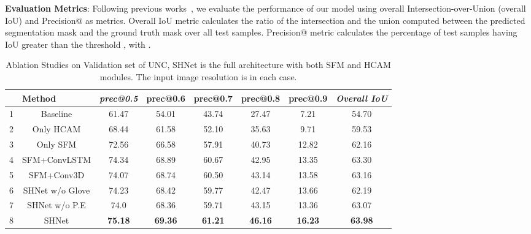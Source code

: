 \documentclass[11pt]{article}
\begin{document}
\textbf{Evaluation Metrics}: Following previous works~\cite{ye2019cross, Chen_2019_ICCV, Hu_2020_CVPR}, we evaluate the performance of our model using overall Intersection-over-Union (overall IoU) and Precision@ as metrics. Overall IoU metric calculates the ratio of the intersection and the union computed between the predicted segmentation mask and the ground truth mask over all test samples. Precision@ metric calculates the percentage of test samples having IoU greater than the threshold , with .

\begin{table*}[]
\small
\begin{center}
\begin{tabular}{r|c|c|c|c|c|c|c}
\hline
\multicolumn{1}{l|}{} &
  \multicolumn{1}{l|}{Method} &
  \multicolumn{1}{l|}{\textit{prec@0.5}} &
  \multicolumn{1}{l|}{prec@0.6} &
  \multicolumn{1}{l|}{prec@0.7} &
  \multicolumn{1}{l|}{prec@0.8} &
  \multicolumn{1}{l|}{prec@0.9} &
  \multicolumn{1}{l}{\textit{Overall IoU}} \\ \hline
1 & Baseline        & 61.47          & 54.01          & 43.74          & 27.47          & 7.21           & 54.70          \\
2 & Only HCAM      & 68.44          & 61.58          & 52.10          & 35.63          & 9.71           & 59.53          \\
3 & Only SFM        & 72.56          & 66.58          & 57.91          & 40.73          & 12.82          & 62.16          \\
4 & SFM+ConvLSTM    & 74.34          & 68.89          & 60.67          & 42.95          & 13.35          & 63.30          \\
5 & SFM+Conv3D      & 74.07          & 68.74          & 60.50          & 43.14          & 13.58          & 63.16          \\
6 & SHNet w/o Glove & 74.23          & 68.42          & 59.77          & 42.47          & 13.66          & 62.19          \\
7 & SHNet w/o P.E   & 74.0          & 68.36          & 59.71          & 43.15          & 13.36          & 63.07          \\
8 & SHNet           & \textbf{75.18} & \textbf{69.36} & \textbf{61.21} & \textbf{46.16} & \textbf{16.23} & \textbf{63.98} \\ \hline
\end{tabular}
\end{center}
\caption{Ablation Studies on Validation set of UNC, SHNet is the full architecture with both SFM and HCAM modules. The input image resolution is  in each case.}
\label{table:ablation_1}
\end{table*}
\end{document}
